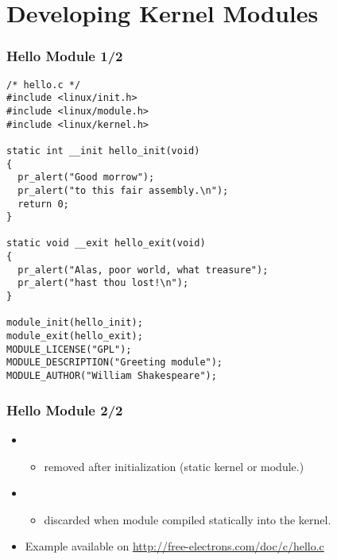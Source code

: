 \section{Developing Kernel Modules}

\begin{frame}[fragile]
  \frametitle{Hello Module 1/2}
\begin{verbatim}
/* hello.c */
#include <linux/init.h>
#include <linux/module.h>
#include <linux/kernel.h>

static int __init hello_init(void)
{
  pr_alert("Good morrow");
  pr_alert("to this fair assembly.\n");
  return 0;
}

static void __exit hello_exit(void)
{
  pr_alert("Alas, poor world, what treasure");
  pr_alert("hast thou lost!\n");
}

module_init(hello_init);
module_exit(hello_exit);
MODULE_LICENSE("GPL");
MODULE_DESCRIPTION("Greeting module");
MODULE_AUTHOR("William Shakespeare");  
\end{verbatim}
\end{frame}

\begin{frame}[fragile]
  \frametitle{Hello Module 2/2}
\begin{itemize}
\item {}
  \begin{itemize}
  \item removed after initialization (static kernel or module.)
  \end{itemize}
\item {}
  \begin{itemize}
  \item discarded when module compiled statically into the kernel.
  \end{itemize}
\item Example available on
  \url{http://free-electrons.com/doc/c/hello.c}
\end{itemize}
\end{frame}

